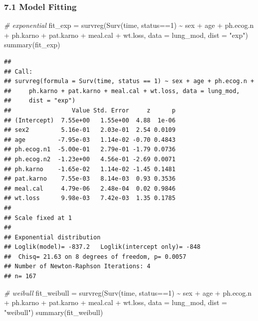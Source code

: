 \documentclass[
]{article}
\newenvironment{Shaded}{\begin{snugshade}}{\end{snugshade}}
\newcommand{\AttributeTok}[1]{\textcolor[rgb]{0.77,0.63,0.00}{#1}}
\newcommand{\CommentTok}[1]{\textcolor[rgb]{0.56,0.35,0.01}{\textit{#1}}}
\newcommand{\DecValTok}[1]{\textcolor[rgb]{0.00,0.00,0.81}{#1}}
\newcommand{\FunctionTok}[1]{\textcolor[rgb]{0.00,0.00,0.00}{#1}}
\newcommand{\NormalTok}[1]{#1}
\newcommand{\OtherTok}[1]{\textcolor[rgb]{0.56,0.35,0.01}{#1}}
\newcommand{\SpecialCharTok}[1]{\textcolor[rgb]{0.00,0.00,0.00}{#1}}
\newcommand{\StringTok}[1]{\textcolor[rgb]{0.31,0.60,0.02}{#1}}
\begin{document}
\hypertarget{model-fitting}{%
\subsubsection{7.1 Model Fitting}\label{model-fitting}}

\begin{Shaded}
\begin{Highlighting}[]
\CommentTok{\# exponential}
\NormalTok{fit\_exp }\OtherTok{=} \FunctionTok{survreg}\NormalTok{(}\FunctionTok{Surv}\NormalTok{(time, status}\SpecialCharTok{==}\DecValTok{1}\NormalTok{) }\SpecialCharTok{\textasciitilde{}}\NormalTok{ sex }\SpecialCharTok{+}\NormalTok{ age }\SpecialCharTok{+}\NormalTok{ ph.ecog.n }\SpecialCharTok{+}\NormalTok{ ph.karno }\SpecialCharTok{+}\NormalTok{ pat.karno }\SpecialCharTok{+}\NormalTok{ meal.cal }\SpecialCharTok{+}\NormalTok{ wt.loss,}
                  \AttributeTok{data =}\NormalTok{ lung\_mod, }\AttributeTok{dist =} \StringTok{"exp"}\NormalTok{)}
\FunctionTok{summary}\NormalTok{(fit\_exp)}
\end{Highlighting}
\end{Shaded}

\begin{verbatim}
## 
## Call:
## survreg(formula = Surv(time, status == 1) ~ sex + age + ph.ecog.n + 
##     ph.karno + pat.karno + meal.cal + wt.loss, data = lung_mod, 
##     dist = "exp")
##                 Value Std. Error     z      p
## (Intercept)  7.55e+00   1.55e+00  4.88  1e-06
## sex2         5.16e-01   2.03e-01  2.54 0.0109
## age         -7.95e-03   1.14e-02 -0.70 0.4843
## ph.ecog.n1  -5.00e-01   2.79e-01 -1.79 0.0736
## ph.ecog.n2  -1.23e+00   4.56e-01 -2.69 0.0071
## ph.karno    -1.65e-02   1.14e-02 -1.45 0.1481
## pat.karno    7.55e-03   8.14e-03  0.93 0.3536
## meal.cal     4.79e-06   2.48e-04  0.02 0.9846
## wt.loss      9.98e-03   7.42e-03  1.35 0.1785
## 
## Scale fixed at 1 
## 
## Exponential distribution
## Loglik(model)= -837.2   Loglik(intercept only)= -848
##  Chisq= 21.63 on 8 degrees of freedom, p= 0.0057 
## Number of Newton-Raphson Iterations: 4 
## n= 167
\end{verbatim}

\begin{Shaded}
\begin{Highlighting}[]
\CommentTok{\# weibull}
\NormalTok{fit\_weibull }\OtherTok{=} \FunctionTok{survreg}\NormalTok{(}\FunctionTok{Surv}\NormalTok{(time, status}\SpecialCharTok{==}\DecValTok{1}\NormalTok{) }\SpecialCharTok{\textasciitilde{}}\NormalTok{ sex }\SpecialCharTok{+}\NormalTok{ age }\SpecialCharTok{+}\NormalTok{ ph.ecog.n }\SpecialCharTok{+}\NormalTok{ ph.karno }\SpecialCharTok{+}\NormalTok{ pat.karno }\SpecialCharTok{+}\NormalTok{ meal.cal }\SpecialCharTok{+}\NormalTok{ wt.loss,}
                      \AttributeTok{data =}\NormalTok{ lung\_mod, }\AttributeTok{dist =} \StringTok{"weibull"}\NormalTok{)}
\FunctionTok{summary}\NormalTok{(fit\_weibull)}
\end{Highlighting}
\end{Shaded}
\end{document}
